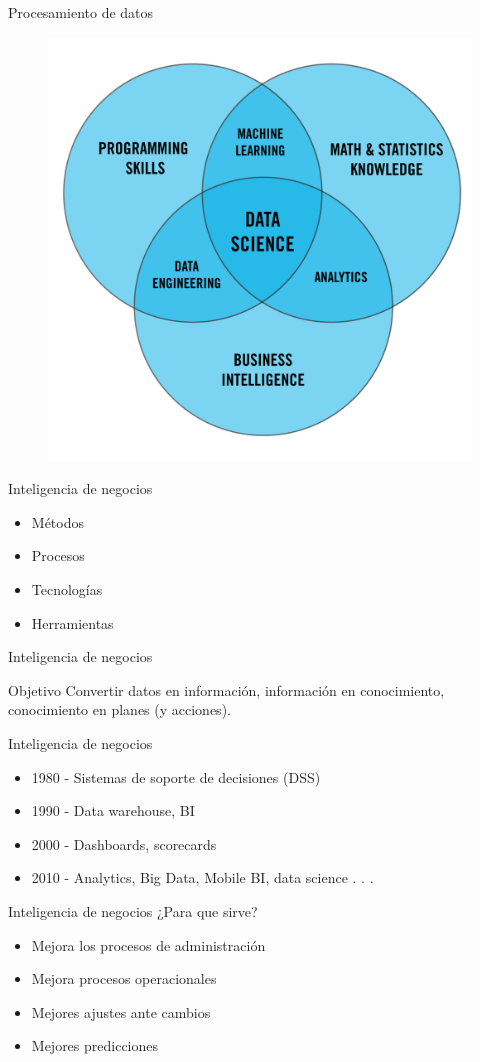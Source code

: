 \documentclass[aspectratio=169]{beamer}
\begin{document}
\begin{frame}{Procesamiento de datos}
	\begin{figure}
		\centering
		\includegraphics[width=0.5\linewidth]{Images/data}	
	\end{figure}
\end{frame}


\begin{frame}{Inteligencia de negocios}
	\begin{itemize}
		\item Métodos
		\item Procesos
		\item Tecnologías
		\item Herramientas
	\end{itemize}
\end{frame}

\begin{frame}{Inteligencia de negocios}
	\begin{alertblock}{Objetivo}
		Convertir datos en información, información en conocimiento, conocimiento en planes (y acciones).
	\end{alertblock}
\end{frame}


\begin{frame}{Inteligencia de negocios}
	\begin{itemize}
		\item 1980 - Sistemas de soporte de decisiones (DSS)
		\item 1990 - Data warehouse, BI
		\item 2000 - Dashboards, scorecards
		\item 2010 - Analytics, Big Data, Mobile BI, data science . . .
	\end{itemize}
\end{frame}


\begin{frame}{Inteligencia de negocios}
	¿Para que sirve?
	\begin{itemize}
		\item Mejora los procesos de administración
		\item Mejora procesos operacionales
		\item Mejores ajustes ante cambios
		\item Mejores predicciones
	\end{itemize}
\end{frame}
\end{document}
